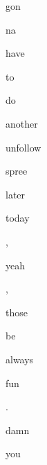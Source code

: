 \documentclass[varwidth]{standalone}
\begin{document}
\begin{CJK*}{UTF8}{gbsn}
{\setlength{\fboxsep}{0pt}\colorbox{white!0}{\parbox{0.9\textwidth}{
\colorbox{red!8.974369615316391}{\strut gon} \colorbox{red!8.974369615316391}{\strut na} \colorbox{red!9.110213071107864}{\strut have} \colorbox{red!8.974369615316391}{\strut to} \colorbox{red!8.974369615316391}{\strut do} \colorbox{red!66.3121223449707}{\strut another} \colorbox{red!66.3121223449707}{\strut unfollow} \colorbox{red!66.3121223449707}{\strut spree} \colorbox{red!66.3121223449707}{\strut later} \colorbox{red!8.974369615316391}{\strut today} \colorbox{red!8.974369615316391}{\strut ,} \colorbox{red!8.974369615316391}{\strut yeah} \colorbox{red!8.974369615316391}{\strut ,} \colorbox{red!8.974369615316391}{\strut those} \colorbox{red!8.974369615316391}{\strut be} \colorbox{red!8.974369615316391}{\strut always} \colorbox{red!8.974369615316391}{\strut fun} \colorbox{red!8.974382281303406}{\strut .} \colorbox{red!8.974369615316391}{\strut damn} \colorbox{red!8.974369615316391}{\strut you} 
}}}
\end{CJK*}
\end{document}
